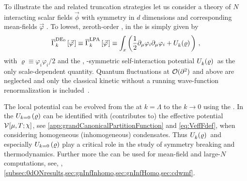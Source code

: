 To illustrate the \de{} and related truncation strategies let us consider a theory of $N$ interacting scalar fields $\vec{\phi}$ with \ON{} symmetry in $d$ dimensions and corresponding mean-fields $\vec{\varphi}$ .
To lowest, zeroth-order \de{} \dash{} \ie{}, in \lpa{} \dash{} the \rgscaledependent{} \eaa{} is simply given by
\begin{align}
	\FSeaa_k^{\mathrm{DE}_0}\sbr{\vec{\varphi}\mkern2mu}\equiv\FSeaa_k^\mathrm{LPA}\sbr{\vec{\varphi}\mkern2mu}\equiv\int_x\del[3]{\frac{1}{2}\partial_\mu\varphi_i\partial_\mu\varphi_i+\Ukrho{}}\,,
	\label{eq:deLPA}
\end{align}
with $\varrho\equiv\varphi_i\varphi_i/2$ and the \rgscaledependent{}, \ON{}-symmetric self-interaction potential $\Ukrho{}$ as the only scale-dependent quantity.
Quantum fluctuations at $\mathcal{O}(\partial^2)$ and above are neglected and only the classical kinetic \dash{} without a running wave-function renormalization \dash{} is included~\cite{Reuter:1993rm,Morris:1994ki}.

The \rgscaledependent{} local potential can be evolved from the \uv{} at $k=\Lambda$ to the \ir{} $k\rightarrow 0$ using the \frgEq{}.
In the \ir{} $U_{k=0}\del{\varrho}$ can be identified with (contributes to) the effective potential $\VeffFArgs{\muT;\FSsf}$, see \cref{app:grandCanonicalPartitionFunction} and \cref{eq:VeffFdef}, when considering homogeneous (inhomogeneous) condensates. 
Thus $\Ukrho{}$ and especially $U_{k=0}\del{\varrho}$ play a critical role in the study of symmetry breaking and thermodynamics.
Further more the \lpa{} can be used for mean-field and large-$N$ computations, see, \eg{}, \cref{subsec:0dONresults,sec:gnInfInhomo,sec:gnInfHomo,sec:cdwmf}. 

